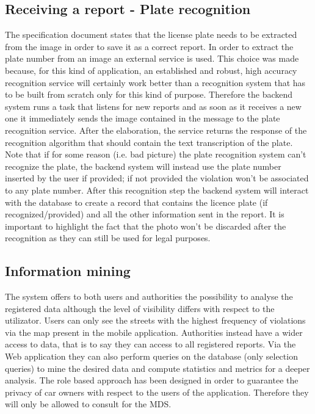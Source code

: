 \subsection{Receiving a report - Plate recognition}
The specification document states that the license plate needs to be extracted from the image in order to save it as a correct report. In order to extract the plate number from an image an external service is used. This choice was made because, for this kind of application, an established and robust, high accuracy recognition service will certainly work better than a recognition system that has to be built from scratch only for this kind of purpose. Therefore the backend system runs a task that listens for new reports and as soon as it receives a new one it immediately sends the image contained in the message to the plate recognition service. After the elaboration, the service returns the response of the recognition algorithm that should contain the text transcription of the plate. Note that if for some reason (i.e. bad picture) the plate recognition system can't recognize the plate, the backend system will instead use the plate number inserted by the user if provided; if not provided the violation won't be associated to any plate number. After this recognition step the backend system will interact with the database to create a record that contains the licence plate (if recognized/provided) and all the other information sent in the report. It is important to highlight the fact that the photo won't be discarded after the recognition as they can still be used for legal purposes.

\subsection{Information mining}
The system offers to both users and authorities the possibility to analyse the registered data although the level of visibility differs with respect to the utilizator. 
Users can only see the streets with the highest frequency of violations via the map present in the mobile application. Authorities instead have a wider access to data, that is to say they can access to all registered reports. Via the Web application they can also perform queries on the database (only selection queries) to mine the desired data and compute statistics and metrics for a deeper analysis. The role based approach has been designed in order to guarantee the privacy of car owners with respect to the users of the application. Therefore they will only be allowed to consult for the MDS.

